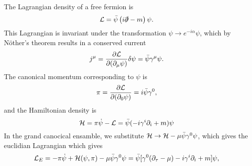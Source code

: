 The Lagrangian density of a free fermion is
\begin{equation}
    \mathcal{L} = \bar \psi \left( i \slashed{\partial} - m \right) \psi.
\end{equation}
This Lagrangian is invariant under the transformation $\psi \rightarrow e^{-i \alpha} \psi$, which by Nöther's theorem results in a conserved current
\begin{equation}
    j^\mu = \pdv{\mathcal{L}}{(\partial_\mu \psi)} \delta \psi=  \bar \psi \gamma^\mu \psi.
\end{equation}
The canonical momentum corresponding to $\psi$ is
\begin{equation}
    \pi = \pdv{\mathcal{L}}{(\partial_0 \psi)} = i \bar \psi \gamma^0,
\end{equation}
and the Hamiltonian density is 
\begin{equation}
    \mathcal{H} = \pi \dot\psi - \mathcal{L}
    = \bar \psi (-i\gamma^i\partial_i + m) \psi
\end{equation}
%
In the grand canocical ensamble, we substitute $\mathcal{H} \rightarrow \mathcal{H} - \mu \bar \psi \gamma^0 \psi$, which gives the euclidian Lagrangian
which gives
%
\begin{equation}
    \mathcal{L}_E = 
    - \pi \dot\psi + \mathcal{H}(\psi, \pi) - \mu \bar \psi \gamma^0 \psi
    = \bar\psi[\gamma^0 (\partial_\tau - \mu) - i\gamma^i \partial_i + m] \psi,
\end{equation}

